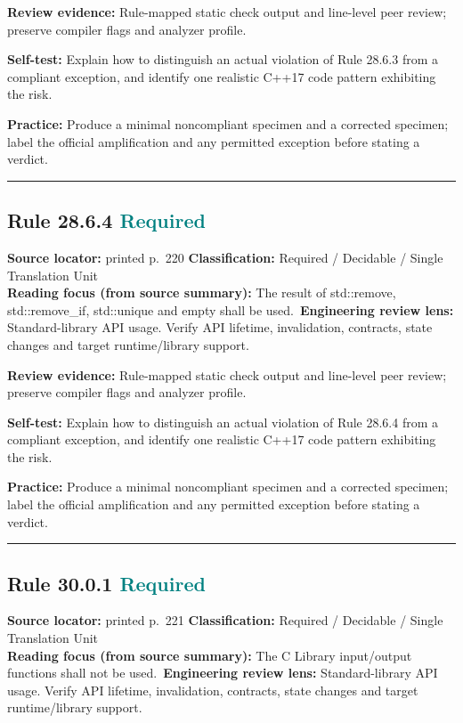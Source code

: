 \documentclass[10pt,letterpaper]{article}
\begin{document}
\textbf{Review evidence:} Rule-mapped static check output and line-level peer review; preserve compiler flags and analyzer profile.

\textbf{Self-test:} Explain how to distinguish an actual violation of Rule 28.6.3 from a compliant exception, and identify one realistic C++17 code pattern exhibiting the risk.\par
\textbf{Practice:} Produce a minimal noncompliant specimen and a corrected specimen; label the official amplification and any permitted exception before stating a verdict.
\smallskip\hrule\smallskip
\subsection*{Rule 28.6.4 \enspace \texorpdfstring{\small\textcolor{teal}{Required}}{Required}}
\noindent\textbf{Source locator:} printed p.~220 \quad\textbf{Classification:} Required / Decidable / Single Translation Unit\\
\textbf{Reading focus (from source summary):} The result of std::remove, std::remove\_if, std::unique and empty shall be used.\
\textbf{Engineering review lens:} Standard-library API usage. Verify API lifetime, invalidation, contracts, state changes and target runtime/library support.

\textbf{Review evidence:} Rule-mapped static check output and line-level peer review; preserve compiler flags and analyzer profile.

\textbf{Self-test:} Explain how to distinguish an actual violation of Rule 28.6.4 from a compliant exception, and identify one realistic C++17 code pattern exhibiting the risk.\par
\textbf{Practice:} Produce a minimal noncompliant specimen and a corrected specimen; label the official amplification and any permitted exception before stating a verdict.
\smallskip\hrule\smallskip
\subsection*{Rule 30.0.1 \enspace \texorpdfstring{\small\textcolor{teal}{Required}}{Required}}
\noindent\textbf{Source locator:} printed p.~221 \quad\textbf{Classification:} Required / Decidable / Single Translation Unit\\
\textbf{Reading focus (from source summary):} The C Library input/output functions shall not be used.\
\textbf{Engineering review lens:} Standard-library API usage. Verify API lifetime, invalidation, contracts, state changes and target runtime/library support.
\end{document}

